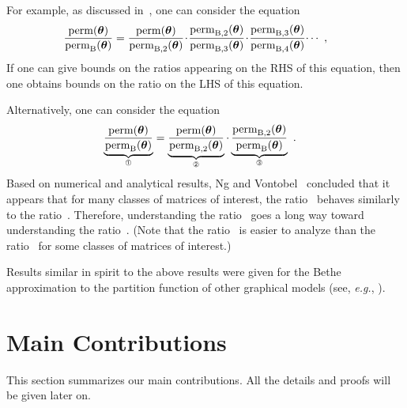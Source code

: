 \documentclass[journal,lettersize,twocolumn]{IEEEtran} %
\newcommand{\matr}[1]{ \bm{#1} }
\newcommand{\perm}{ \mathrm{perm} }
\newcommand{\permb}{ \mathrm{perm}_{\mathrm{B}} }
\newcommand{\permbM}[1]{\perm_{ \mathrm{B}, #1 }}
\newcommand{\mtheta}{\matr{\theta}}
\newcommand{\eg}{\textit{e.g.}}
\begin{document}
For example, as discussed in~\cite[Sec.~VII]{Vontobel2013}, one can consider
the equation
\begin{align}
  \hspace{-0.25cm}
  \frac{\perm(\mtheta)}{\permb(\mtheta)}
    &= \frac{\perm(\mtheta)}{\permbM{2}(\mtheta)}
       \!\cdot\!
       \frac{\permbM{2}(\mtheta) }{\permbM{3}(\mtheta)}
       \!\cdot\!
       \frac{\permbM{3}(\mtheta) }{\permbM{4}(\mtheta)}
       \!\cdots \ ,
         \label{eq:Z:ratios:long:1}
\end{align}
If one can give bounds on the ratios appearing on the RHS of this equation,
then one obtains bounds on the ratio on the LHS of this equation.

%
%
%
%
%
%
%
%
%
%
%

%

Alternatively, one can consider the equation
\begin{align}
  \underbrace{
    \frac{\perm(\mtheta)}
         {\permb(\mtheta)}
  }_{\text{\ding{192}}}
    &= \underbrace{
         \frac{\perm(\mtheta)}
              {\permbM{2}(\mtheta)}
       }_{\text{\ding{193}}}
       \cdot
       \underbrace{
         \frac{\permbM{2}(\mtheta)}
              {\permb(\mtheta)}
       }_{\text{\ding{194}}} \ .
         \label{eq:perm:ratios:1}
\end{align}
Based on numerical and analytical results, Ng and Vontobel~\cite{KitShing2022}
concluded that it appears that for many classes of matrices of interest, the
ratio~ behaves similarly to the ratio~. Therefore,
understanding the ratio~ goes a long way toward understanding the
ratio~. (Note that the ratio~ is easier to analyze than
the ratio~ for some classes of matrices of interest.)

%

Results similar in spirit to the above results were given for the Bethe
approximation to the partition function of other graphical models (see, \eg,
\cite{NIPS2012_4649,Vontobel:16:1,P.Csikvari2022}).

%
%

\ifx\withclearpagecommands\x
\clearpage
\fi

\section{Main Contributions}
\label{sec:main:constributions:1}

%

This section summarizes our main contributions. All the details and proofs
will be given later on.
\end{document}
